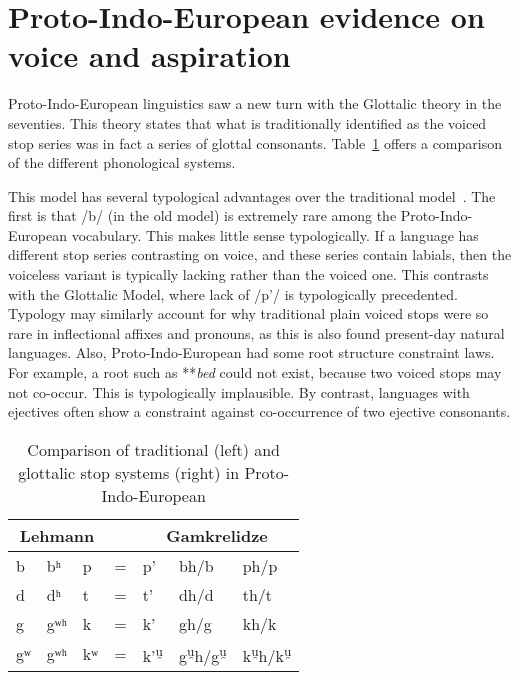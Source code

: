 \section{Proto-Indo-European evidence on voice and aspiration}
Proto-Indo-European linguistics saw a new turn with the Glottalic theory in the seventies. This theory states that what is traditionally identified as the voiced stop series was in fact a series of glottal consonants.  Table~\ref{bomhardcomparison} offers a comparison of the different phonological systems.

This model has several typological advantages over the traditional model~\autocite[377]{bomhard_glottalic_2016}. The first is that /b/ (in the old model) is extremely rare among the Proto-Indo-European vocabulary. This makes little sense typologically. If a language has different stop series contrasting on voice, and these series contain labials, then the voiceless variant is typically lacking rather than the voiced one. This contrasts with the Glottalic Model, where lack of  /p'/ is typologically precedented. Typology may similarly account for why traditional plain voiced stops were so rare in inflectional affixes and pronouns, as this is also found present-day natural languages. Also, Proto-Indo-European had some root structure constraint laws. For example, a root such as **\textit{bed} could not exist, because two voiced stops may not co-occur. This is typologically implausible. By contrast, languages with ejectives often show a constraint against co-occurrence of two ejective consonants.


\begin{table}[h]
\centering
\begin{tabular}{@{}lllllll@{}}
\toprule
\multicolumn{3}{c}{\textbf{Lehmann}} & \textbf{} & \multicolumn{3}{c}{\textbf{Gamkrelidze}} \\ \midrule
b & bʰ & p & = & p’ & bh/b & ph/p \\
d & dʰ & t & = & t’ & dh/d & th/t \\
g & gʷʰ & k & = & k’ & gh/g & kh/k \\
gʷ & gʷʰ & kʷ & = & k’\textsuperscript{u̯} & g\textsuperscript{u̯}h/g\textsuperscript{u̯} & k\textsuperscript{u̯}h/k\textsuperscript{u̯} \\ \bottomrule
\end{tabular}
\caption{Comparison of traditional (left) and glottalic stop systems (right) in Proto-Indo-European \autocite[376]{bomhard_glottalic_2016}}
\label{bomhardcomparison}
\end{table}

